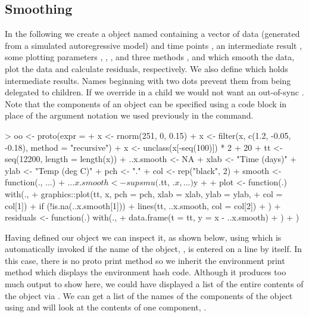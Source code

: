 \documentclass{Z}
\begin{document}
\subsection{Smoothing}
\label{sec:smooth}

In the following we create a  object named 
containing a vector of data  (generated from a simulated
autoregressive model) and time points
, an intermediate result
, some plotting parameters , ,
,  and three methods , 
and  which smooth the data, plot the data and
calculate residuals, respectively.  We also define 
which holds intermediate results.  Names beginning with two dots
prevent them from being delegated to children.  If we override
 in a child we would not want an out-of-sync .
Note that the components of an object can be specified using a code
block in place of the argument notation we used previously in the
 command.

\begin{Schunk}
\begin{Sinput}
> oo <- proto(expr = {
+     x <- rnorm(251, 0, 0.15)
+     x <- filter(x, c(1.2, -0.05, -0.18), method = "recursive")
+     x <- unclass(x[-seq(100)]) * 2 + 20
+     tt <- seq(12200, length = length(x))
+     ..x.smooth <- NA
+     xlab <- "Time (days)"
+     ylab <- "Temp (deg C)"
+     pch <- "."
+     col <- rep("black", 2)
+     smooth <- function(., ...) {
+         .$..x.smooth <- supsmu(.$tt, .$x, ...)$y
+     }
+     plot <- function(.) with(., {
+         graphics::plot(tt, x, pch = pch, xlab = xlab, ylab = ylab, 
+             col = col[1])
+         if (!is.na(..x.smooth[1])) 
+             lines(tt, ..x.smooth, col = col[2])
+     })
+     residuals <- function(.) with(., {
+         data.frame(t = tt, y = x - ..x.smooth)
+     })
+ })
\end{Sinput}
\end{Schunk}

Having defined our  object we can inspect it, as shown
below, using 
 which is automatically invoked if the
name of the object, , is entered on a line by itself.  
In this case, there is no proto print method so we inherit the
environment print method which displays the environment hash code.  
Although it produces too much output to show here,
we could have displayed a 
list of the entire contents of the object 
via .
We can get a list of the names of the 
components of the object using  and will look
at the contents of one component, .
\end{document}
